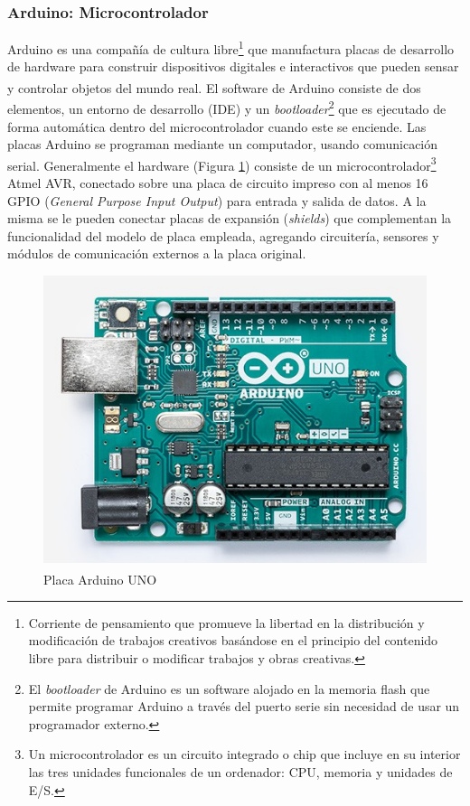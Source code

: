         \subsubsection{Arduino: Microcontrolador}
        
            \par Arduino\textsuperscript{\textregistered} es una compañía de cultura libre\footnote{Corriente de pensamiento que promueve la libertad en la distribución y modificación de trabajos creativos basándose en el principio del contenido libre para distribuir o modificar trabajos y obras creativas.} que manufactura placas de desarrollo de hardware para construir dispositivos digitales e interactivos que pueden sensar y controlar objetos del mundo real. El software de Arduino\textsuperscript{\textregistered} consiste de dos elementos, un entorno de desarrollo (IDE) y un \textit{bootloader}\footnote{El \textit{bootloader} de Arduino es un software alojado en la memoria flash que permite programar Arduino a través del puerto serie sin necesidad de usar un programador externo.} que es ejecutado de forma automática dentro del microcontrolador cuando este se enciende. Las placas Arduino se programan mediante un computador, usando comunicación serial. Generalmente el hardware (Figura \ref{boardArduino}) consiste de un microcontrolador\footnote{Un microcontrolador es un circuito integrado o chip que incluye en su interior las tres unidades funcionales de un ordenador: CPU, memoria y unidades de E/S.} Atmel AVR, conectado sobre una placa de circuito impreso con al menos 16 GPIO (\textit{General Purpose Input Output}) para entrada y salida de datos. A la misma se le pueden conectar placas de expansión (\textit{shields}) que complementan la funcionalidad del modelo de placa empleada, agregando circuitería, sensores y módulos de comunicación externos a la placa original.
        
            \begin{figure}[h]
                \centering
                \includegraphics[scale=0.6]{hardware/Arduino.jpg}
                \caption{Placa Arduino\textsuperscript{\textregistered} UNO}
                \label{boardArduino}
            \end{figure}
        
